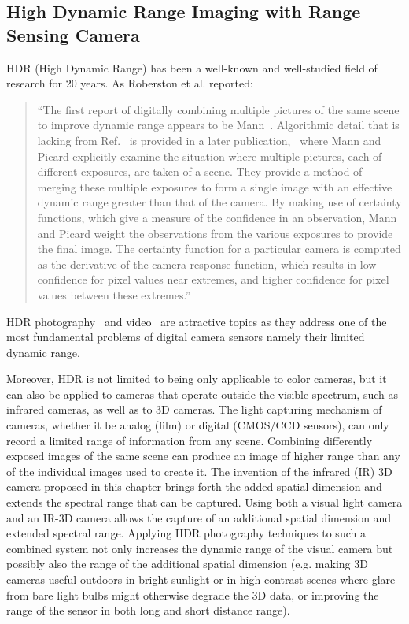 \subsection{High Dynamic Range Imaging with Range Sensing Camera}
HDR (High Dynamic Range) has been a well-known and well-studied field of
research for 20 years.  As Roberston et al. reported:
\begin{quote}
``The first report of digitally combining multiple pictures
 of the same scene to improve dynamic range appears to be
 Mann~\cite{mannist}.
 Algorithmic detail that is lacking from Ref.~\cite{mannist} is
 provided in a later publication,~\cite{mannwyckofftr}
 where Mann and Picard explicitly examine the situation where multiple pictures,
 each of different exposures, are taken of a scene. They
 provide a method of merging these multiple exposures to
 form a single image with an effective dynamic range
 greater than that of the camera. By making use of certainty
 functions, which give a measure of the confidence in an
 observation, Mann and Picard weight the observations from
 the various exposures to provide the final image. The certainty
 function for a particular camera is computed as the
 derivative of the camera response function, which results in
 low confidence for pixel values near extremes, and higher
 confidence for pixel values
 between these extremes.''~\cite{robertson2003estimation}
\end{quote}

HDR photography~\cite{candocia1, candocia2, candocia3,wyckoff1962experimental,mannist}
and video~\cite{mann2012hdrchitecture,lo2012high,mann2012realtime, HDRVideoCamera11, kang2003high}
are attractive topics as they address one of the most fundamental problems of
digital camera sensors namely their limited dynamic range.

Moreover, HDR is not limited to being only applicable to color cameras, but it can also be applied to cameras that operate outside the visible spectrum, such as infrared cameras, as well as to 3D cameras.  The light capturing mechanism of cameras, whether it be analog (film) or digital (CMOS/CCD sensors), can only record a limited range of information from any scene. Combining differently exposed images of the same scene can produce an image of higher range than any of the individual images used to create it. The invention of the infrared (IR) 3D camera proposed in this chapter brings forth the added spatial dimension and extends the spectral range that can be captured. Using both a visual light camera and an IR-3D camera allows the capture of an additional spatial dimension and extended spectral range. Applying HDR photography techniques to such a combined system not only increases the dynamic range of the visual camera but possibly also the range of the additional spatial dimension (e.g. making 3D cameras useful outdoors in bright sunlight or in high contrast scenes where glare from bare light bulbs might otherwise degrade the 3D data, or improving the range of the sensor in both long and short distance range).


